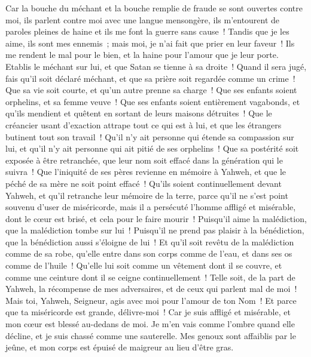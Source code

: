 \begin{multicols}{2}
Car la bouche du méchant et la bouche remplie de fraude se sont ouvertes contre moi, ils parlent contre moi avec une langue mensongère,
ils m'entourent de paroles pleines de haine et ils me font la guerre sans cause~!
Tandis que je les aime, ils sont mes ennemis~; mais moi, je n'ai fait que prier en leur faveur~!
Ils me rendent le mal pour le bien, et la haine pour l'amour que je leur porte.
Etablis le méchant sur lui, et que Satan se tienne à sa droite~!
Quand il sera jugé, fais qu'il soit déclaré méchant, et que sa prière soit regardée comme un crime~!
Que sa vie soit courte, et qu'un autre prenne sa charge~!
Que ses enfants soient orphelins, et sa femme veuve~!
Que ses enfants soient entièrement vagabonds, et qu'ils mendient et quêtent en sortant de leurs maisons détruites~!
Que le créancier usant d'exaction attrape tout ce qui est à lui, et que les étrangers butinent tout son travail~!
Qu'il n'y ait personne qui étende sa compassion sur lui, et qu'il n'y ait personne qui ait pitié de ses orphelins~!
Que sa postérité soit exposée à être retranchée, que leur nom soit effacé dans la génération qui le suivra~!
Que l'iniquité de ses pères revienne en mémoire à Yahweh, et que le péché de sa mère ne soit point effacé~!
Qu'ils soient continuellement devant Yahweh, et qu'il retranche leur mémoire de la terre,
parce qu'il ne s'est point souvenu d'user de miséricorde, mais il a persécuté l'homme affligé et misérable, dont le cœur est brisé, et cela pour le faire mourir~!
Puisqu'il aime la malédiction, que la malédiction tombe sur lui~! Puisqu'il ne prend pas plaisir à la bénédiction, que la bénédiction aussi s'éloigne de lui~!
Et qu'il soit revêtu de la malédiction comme de sa robe, qu'elle entre dans son corps comme de l'eau, et dans ses os comme de l'huile~!
Qu'elle lui soit comme un vêtement dont il se couvre, et comme une ceinture dont il se ceigne continuellement~!
Telle soit, de la part de Yahweh, la récompense de mes adversaires, et de ceux qui parlent mal de moi~!
Mais toi, Yahweh, Seigneur, agis avec moi pour l'amour de ton Nom~! Et parce que ta miséricorde est grande, délivre-moi~!
Car je suis affligé et misérable, et mon cœur est blessé au-dedans de moi.
Je m'en vais comme l'ombre quand elle décline, et je suis chassé comme une sauterelle.
Mes genoux sont affaiblis par le jeûne, et mon corps est épuisé de maigreur au lieu d'être gras.

\end{multicols}
